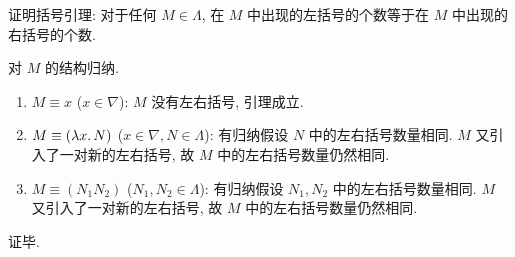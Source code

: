\begin{problem}
证明括号引理: 对于任何 $M \in \Lambda$, 在 $M$ 中出现的左括号的个数等于在 $M$ 中出现的右括号的个数.
\end{problem}

\begin{solution}
对 $M$ 的结构归纳.

\begin{enumerate}
\item $M \equiv x$ ($x \in \nabla$): $M$ 没有左右括号, 引理成立.
\item $M \equiv (\lambda {x}.\,{N})$ ($x \in \nabla, N \in \Lambda$): 有归纳假设 $N$ 中的左右括号数量相同. $M$ 又引入了一对新的左右括号, 故 $M$ 中的左右括号数量仍然相同.
\item $M \equiv (N_1 N_2)$ ($N_1, N_2 \in \Lambda$): 有归纳假设 $N_1, N_2$ 中的左右括号数量相同. $M$ 又引入了一对新的左右括号, 故 $M$ 中的左右括号数量仍然相同.
\end{enumerate}

证毕.
\end{solution}
